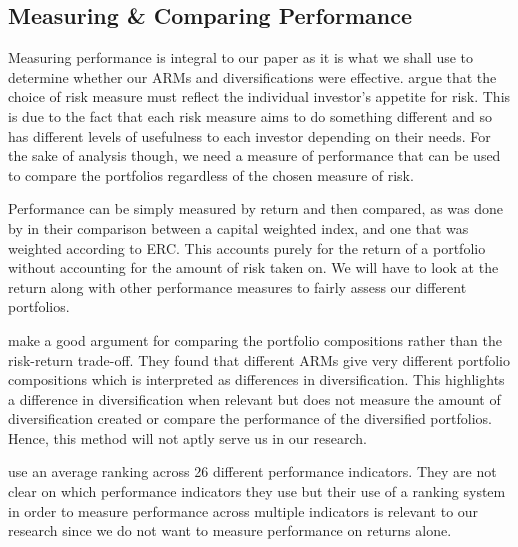 \documentclass[12pt,a4paper]{article}
\begin{document}
\subsection{Measuring \& Comparing Performance}
\label{subsec:Performance}

Measuring performance is integral to our paper as it is what we shall use to determine whether our ARMs and diversifications were effective. \cite{byrne2004different} argue that the choice of risk measure must reflect the individual investor’s appetite for risk. This is due to the fact that each risk measure aims to do something different and so has different levels of usefulness to each investor depending on their needs. For the sake of analysis though, we need a measure of performance that can be used to compare the portfolios regardless of the chosen measure of risk.

Performance can be simply measured by return and then compared, as was done by \cite{bruder2012managing} in their comparison between a capital weighted index, and one that was weighted according to ERC. This accounts purely for the return of a portfolio without accounting for the amount of risk taken on. We will have to look at the return along with other performance measures to fairly assess our different portfolios.

\cite{byrne2004different} make a good argument for comparing the portfolio compositions rather than the risk-return trade-off. They found that different ARMs give very different portfolio compositions which is interpreted as differences in diversification. This highlights a difference in diversification when relevant but does not measure the amount of diversification created or compare the performance of the diversified portfolios. Hence, this method will not aptly serve us in our research.

\cite{righi2017simulation} use an average ranking across 26 different performance indicators. They are not clear on which performance indicators they use but their use of a ranking system in order to measure performance across multiple indicators is relevant to our research since we do not want to measure performance on returns alone.
\end{document}
